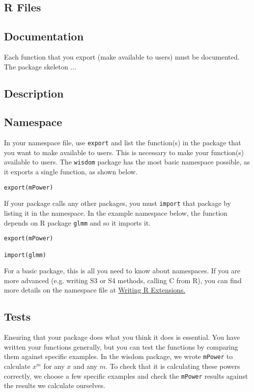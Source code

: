 \documentclass{article}
\begin{document}
\subsection{R Files} 

\subsection{Documentation}
Each function that you export (make available to users) must be documented. The package skeleton ...
\subsection{Description}
\subsection{Namespace} In your namespace file, use  \texttt{export} and list the function(s) in the package that you want to make available to users. This is necessary to make your function(s) available to users. The  \texttt{wisdom} package has the most basic namespace possible, as it exports a single function, as shown below.

\begin{verbatim}
export(mPower)
\end{verbatim}

If your package calls any other packages, you must \texttt{import} that package by listing it in the namespace. In the example namespace below, the function depends on R package \texttt{glmm} and so it imports it.

\begin{verbatim}
export(mPower)

import(glmm)
\end{verbatim}

For a basic package, this is all you need to know about namespaces. If you are more advanced (e.g. writing S3 or S4 methods, calling C from R), you can find more details on the namespace file at  \href{https://cran.r-project.org/doc/manuals/R-exts.html#Package-namespaces}{Writing R Extensions.}

\subsection{Tests} Ensuring that your package does what you think it does is essential. You have written your functions generally, but you can test the functions by comparing them against specific examples. In the wisdom package, we wrote \texttt{mPower} to calculate $x^m$ for any $x$ and any $m$. To check that it is calculating these powers correctly, we choose a few specific examples and check the \texttt{mPower} results against the results we calculate ourselves.\\
\end{document}
